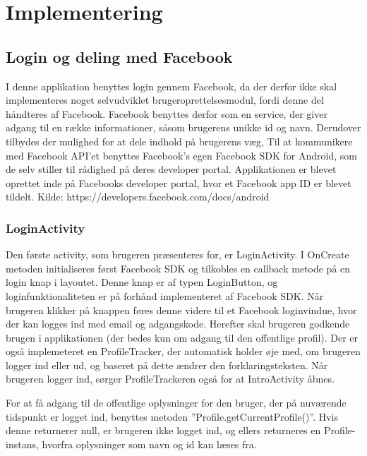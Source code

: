 \thispagestyle{fancy}
\chapter{Implementering}
\label{chp:Implementering}

\section{Login og deling med Facebook}
I denne applikation benyttes login gennem Facebook, da der derfor ikke skal implementeres noget selvudviklet brugeroprettelsesmodul, fordi denne del håndteres af Facebook. Facebook benyttes derfor som en service, der giver adgang til en række informationer, såsom brugerens unikke id og navn. Derudover tilbydes der mulighed for at dele indhold på brugerens væg, Til at kommunikere med Facebook API’et benyttes Facebook’s egen Facebook SDK for Android, som de selv stiller til rådighed på deres developer portal. Applikationen er blevet oprettet inde på Facebooks developer portal, hvor et Facebook app ID er blevet tildelt. 
Kilde: https://developers.facebook.com/docs/android

\subsection{LoginActivity}
Den første activity, som brugeren præsenteres for, er LoginActivity. I OnCreate metoden initialiseres først Facebook SDK og tilkobles en callback metode på en login knap i layoutet. Denne knap er af typen LoginButton, og loginfunktionaliteten er på forhånd implementeret af Facebook SDK. Når brugeren klikker på knappen føres denne videre til et Facebook loginvindue, hvor der kan logges ind med email og adgangskode. Herefter skal brugeren godkende brugen i applikationen (der bedes kun om adgang til den offentlige profil). Der er også implemeteret en ProfileTracker, der automatisk holder øje med, om brugeren logger ind eller ud, og baseret på dette ændrer den forklaringsteksten. Når brugeren logger ind, sørger ProfileTrackeren også for at IntroActivity åbnes.

For at få adgang til de offentlige oplysninger for den bruger, der på nuværende tidspunkt er logget ind, benyttes metoden ”Profile.getCurrentProfile()”. Hvis denne returnerer null, er brugeren ikke logget ind, og ellers returneres en Profile-instans, hvorfra oplysninger som navn og id kan læses fra.


